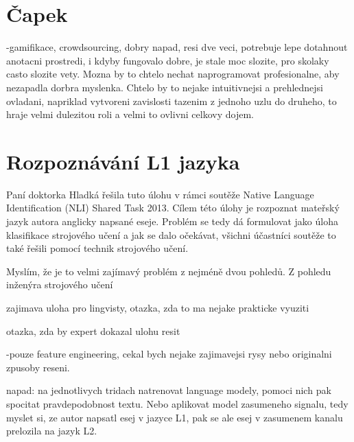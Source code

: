 \documentclass[12pt,a4paper]{report}
\begin{document}
\section*{Čapek}

-gamifikace, crowdsourcing, dobry napad, resi dve veci, potrebuje lepe dotahnout anotacni
prostredi, i kdyby fungovalo dobre, je stale moc slozite, pro skolaky casto slozite vety.  
Mozna by to chtelo nechat naprogramovat profesionalne, aby nezapadla dorbra myslenka. Chtelo by to nejake
intuitivnejsi a prehlednejsi  ovladani, napriklad vytvoreni zavislosti tazenim z jednoho uzlu do druheho,
to hraje velmi dulezitou roli a velmi to ovlivni celkovy dojem. 

\section*{Rozpoznávání L1 jazyka}

Paní doktorka Hladká řešila tuto úlohu v rámci soutěže Native Language
Identification (NLI) Shared Task 2013.  Cílem této úlohy je rozpoznat mateřský
jazyk autora anglicky napsané eseje.  Problém se tedy dá formulovat jako úloha
klasifikace strojového učení a jak se dalo očekávat, všichni účastníci soutěže
to také řešili pomocí technik strojového učení. 

Myslím, že je to velmi zajímavý problém z nejméně dvou pohledů. Z pohledu inženýra 
strojového učení



zajimava uloha pro lingvisty, otazka, zda to ma nejake prakticke vyuziti

otazka, zda by expert dokazal ulohu resit

-pouze feature engineering, cekal bych nejake zajimavejsi rysy nebo originalni zpusoby reseni. 

napad: na jednotlivych tridach natrenovat language modely, pomoci nich pak spocitat pravdepodobnost textu. Nebo aplikovat
model zasumeneho signalu, tedy myslet si, ze autor napsatl esej v jazyce L1, pak se ale esej v zasumenem kanalu prelozila na jazyk L2.
\end{document}
